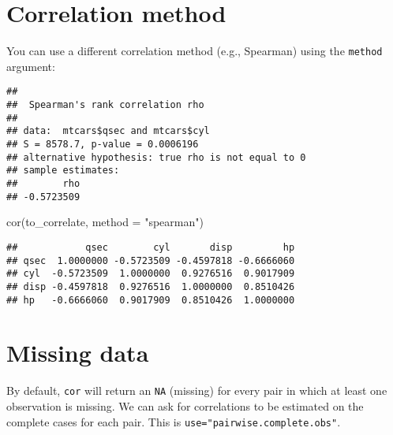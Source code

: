 \documentclass[
]{book}
\newenvironment{Shaded}{\begin{snugshade}}{\end{snugshade}}
\newcommand{\AttributeTok}[1]{\textcolor[rgb]{0.77,0.63,0.00}{#1}}
\newcommand{\FunctionTok}[1]{\textcolor[rgb]{0.00,0.00,0.00}{#1}}
\newcommand{\NormalTok}[1]{#1}
\newcommand{\SpecialCharTok}[1]{\textcolor[rgb]{0.00,0.00,0.00}{#1}}
\newcommand{\StringTok}[1]{\textcolor[rgb]{0.31,0.60,0.02}{#1}}
\begin{document}
\hypertarget{correlation-method}{%
\section{Correlation method}\label{correlation-method}}

You can use a different correlation method (e.g., Spearman) using the \texttt{method} argument:

\begin{Shaded}
\end{Shaded}

\begin{verbatim}
## 
##  Spearman's rank correlation rho
## 
## data:  mtcars$qsec and mtcars$cyl
## S = 8578.7, p-value = 0.0006196
## alternative hypothesis: true rho is not equal to 0
## sample estimates:
##        rho 
## -0.5723509
\end{verbatim}

\begin{Shaded}
\begin{Highlighting}[]
\FunctionTok{cor}\NormalTok{(to\_correlate, }\AttributeTok{method =} \StringTok{"spearman"}\NormalTok{)}
\end{Highlighting}
\end{Shaded}

\begin{verbatim}
##            qsec        cyl       disp         hp
## qsec  1.0000000 -0.5723509 -0.4597818 -0.6666060
## cyl  -0.5723509  1.0000000  0.9276516  0.9017909
## disp -0.4597818  0.9276516  1.0000000  0.8510426
## hp   -0.6666060  0.9017909  0.8510426  1.0000000
\end{verbatim}

\hypertarget{missing-data}{%
\section{Missing data}\label{missing-data}}

By default, \texttt{cor} will return an \texttt{NA} (missing) for every pair in which at least one observation is missing. We can ask for correlations to be estimated on the complete cases for each pair. This is \texttt{use="pairwise.complete.obs"}.
\end{document}
